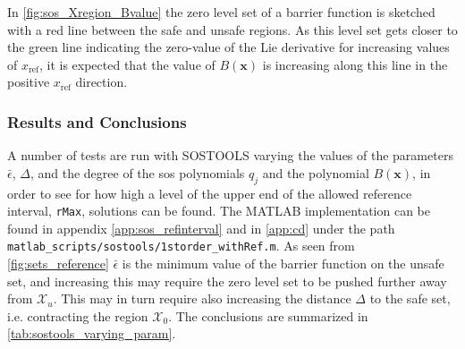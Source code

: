 In \autoref{fig:sos_Xregion_Bvalue} the zero level set of a barrier function is sketched with a red line between the safe and unsafe regions. As this level set gets  closer to the green line indicating the zero-value of the Lie derivative for increasing values of $x_\text{ref}$, it is expected that the value of  $B(\mathbf{x})$ is increasing along this line in the positive $x_\text{ref}$ direction.




\subsubsection{Results and Conclusions}

\vspace{-2mm}
A number of tests are run with SOSTOOLS varying the values of the parameters  $\bar{\epsilon}$, $\Delta$, and the degree of the \gls{sos} polynomials $q_j$ and the polynomial $B(\mathbf{x})$, %
in order to see for how high a level of the upper  end  of the allowed reference interval, \texttt{rMax}, solutions can be found. The MATLAB implementation can be found in appendix \ref{app:sos_refinterval} and in \autoref{app:cd} under the path \texttt{matlab\_scripts/sostools/1storder\_withRef.m}.
As seen from \autoref{fig:sets_reference} $\bar{\epsilon}$ is the minimum value of the barrier function on the unsafe set, and increasing this may require the zero level set to be pushed further away from $\mathcal{X}_u$. This may in turn require also increasing the distance $\Delta$ to the safe set, i.e. contracting the region $\mathcal{X}_0$.
The conclusions are summarized in \autoref{tab:sostools_varying_param}.


